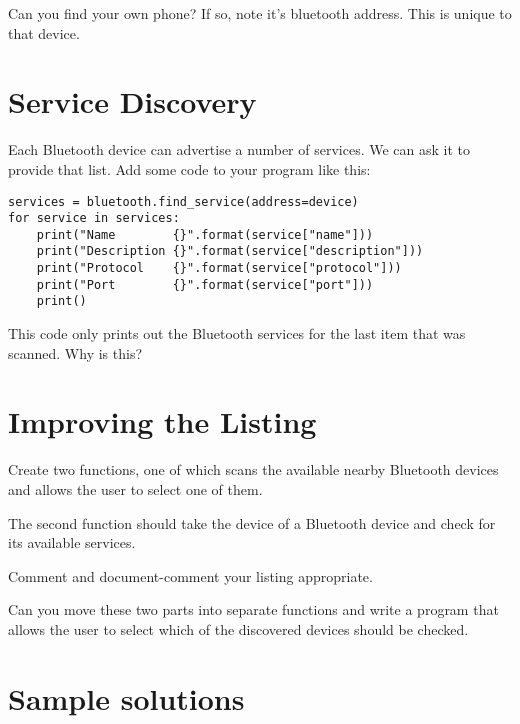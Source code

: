 \documentclass[12pt,oneside]{cttutorial}
\begin{document}
Can you find your own phone? If so, note it's bluetooth address. This is unique to that device.

\section{Service Discovery}

Each Bluetooth device can advertise a number of services. We can ask it to provide that list. Add
some code to your program like this:

\begin{lstlisting}
services = bluetooth.find_service(address=device)
for service in services:
    print("Name        {}".format(service["name"]))
    print("Description {}".format(service["description"]))
    print("Protocol    {}".format(service["protocol"]))
    print("Port        {}".format(service["port"]))
    print()
\end{lstlisting}

This code only prints out the Bluetooth services for the last item that was scanned. Why is this?


\section{Improving the Listing}

Create two functions, one of which scans the available nearby Bluetooth devices and allows the user to select one of them.

The second function should take the device of a Bluetooth device and check for its available services.

Comment and document-comment your listing appropriate.

Can you move these two parts into separate functions and write a program that allows the user to select which of the discovered devices should be checked.






\newpage
\section{Sample solutions}
\end{document}
